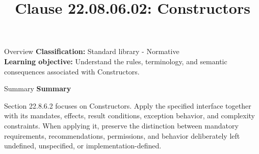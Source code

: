 \documentclass[10pt,letterpaper]{article}
\title{Clause 22.08.06.02: Constructors}
\author{}
\date{}
\begin{document}
\maketitle
\begin{CornellOverviewBox}{Overview}
\textbf{Classification:} Standard library - Normative\\[2pt]
\textbf{Learning objective:} Understand the rules, terminology, and semantic consequences associated with Constructors.
\end{CornellOverviewBox}\begin{CornellSummaryBox}{Summary}
{\sffamily\bfseries\color{Accent} Summary}\par\vspace{3pt}Section 22.8.6.2 focuses on Constructors. Apply the specified interface together with its mandates, effects, result conditions, exception behavior, and complexity constraints. When applying it, preserve the distinction between mandatory requirements, recommendations, permissions, and behavior deliberately left undefined, unspecified, or implementation-defined.
\end{CornellSummaryBox}
\end{document}
